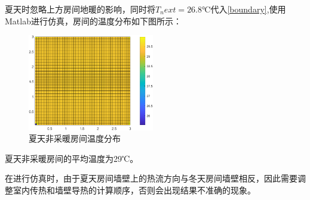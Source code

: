 夏天时忽略上方房间地暖的影响，同时将$T_next = 26.8℃$代入\eqref{boundary},使用Matlab进行仿真，房间的温度分布如下图所示：
\\
\begin{figure}[h]
    \centering
    \includegraphics[width = 5.5cm]{figures/mainroom-summer.png}
    \caption{夏天非采暖房间温度分布}
    \label{夏天非采暖房间温度分布}
\end{figure}

夏天非采暖房间的平均温度为29℃。

在进行仿真时，由于夏天房间墙壁上的热流方向与冬天房间墙壁相反，因此需要调整室内传热和墙壁导热的计算顺序，否则会出现结果不准确的现象。